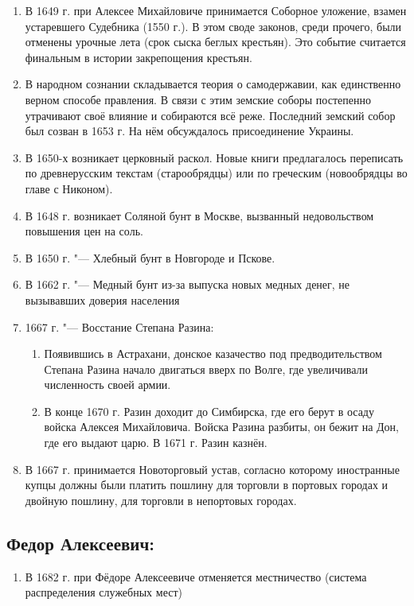 \begin{enumerate}
    \item{ В 1649 г. при Алексее Михайловиче принимается Соборное уложение, взамен устаревшего Судебника (1550 г.). В этом своде законов, среди прочего, были отменены урочные лета (срок сыска беглых крестьян). Это событие считается финальным в истории закрепощения крестьян. }
    \item{ В народном сознании складывается теория о самодержавии, как единственно верном способе правления. В связи с этим земские соборы постепенно утрачивают своё влияние и собираются всё реже. Последний земский собор был созван в 1653 г. На нём обсуждалось присоединение Украины. }
    \item{ В 1650-х возникает церковный раскол. Новые книги предлагалось переписать по древнерусским текстам (старообрядцы) или по греческим (новообрядцы во главе с Никоном). }
    \item{ В 1648 г. возникает Соляной бунт в Москве, вызванный недовольством повышения цен на соль. }
    \item{ В 1650 г. "--- Хлебный бунт в Новгороде и Пскове. }
    \item{ В 1662 г. "--- Медный бунт из-за выпуска новых медных денег, не вызывавших доверия населения }
    \item{ 1667 г. "--- Восстание Степана Разина:
        \begin{enumerate}
            \item{ Появившись в Астрахани, донское казачество под предводительством Степана Разина начало двигаться вверх по Волге, где увеличивали численность своей армии. }
            \item{ В конце 1670 г. Разин доходит до Симбирска, где его берут в осаду войска Алексея Михайловича. Войска Разина разбиты, он бежит на Дон, где его выдают царю. В 1671 г. Разин казнён. }
        \end{enumerate}
    }
\item{ В 1667 г. принимается Новоторговый устав, согласно которому иностранные купцы должны были платить пошлину для торговли в портовых городах и двойную пошлину, для торговли в непортовых городах. }
\end{enumerate}

\subsection{Федор Алексеевич:}

\begin{enumerate}
    \item{ В 1682 г. при Фёдоре Алексеевиче отменяется местничество (система распределения служебных мест) }
\end{enumerate}
